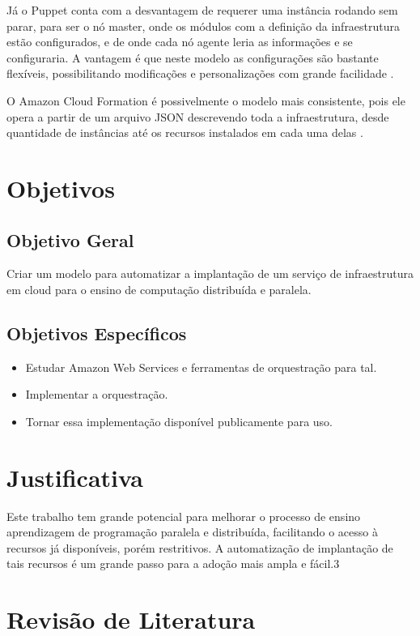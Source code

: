 \documentclass[12pt]{article}
\begin{document}
Já o Puppet conta com a desvantagem de requerer uma instância rodando sem parar, para ser o nó master, onde os módulos com a definição da infraestrutura estão configurados, e de onde cada nó agente leria as informações e se configuraria. A vantagem é que neste modelo as configurações são bastante flexíveis, possibilitando modificações e personalizações com grande facilidade \cite{puppetaws}.

O Amazon Cloud Formation é possivelmente o modelo mais consistente, pois ele opera a partir de um arquivo JSON descrevendo toda a infraestrutura, desde quantidade de instâncias até os recursos instalados em cada uma delas \cite{awscf}.


\section{Objetivos}
\subsection{Objetivo Geral}
Criar um modelo para automatizar a implantação de um serviço de infraestrutura em cloud para o ensino de computação distribuída e paralela.

\subsection{Objetivos Específicos}
\begin{itemize}
	\item Estudar Amazon Web Services e ferramentas de orquestração para tal.
	\item Implementar a orquestração.
	\item Tornar essa implementação disponível publicamente para uso.
    
\end{itemize}

\section{Justificativa}
Este trabalho tem grande potencial para melhorar o processo de ensino aprendizagem de programação paralela e distribuída, facilitando o acesso à recursos já disponíveis, porém restritivos. A automatização de implantação de tais recursos é um grande passo para a adoção mais ampla e fácil.3

\section{Revisão de Literatura}
\end{document}
